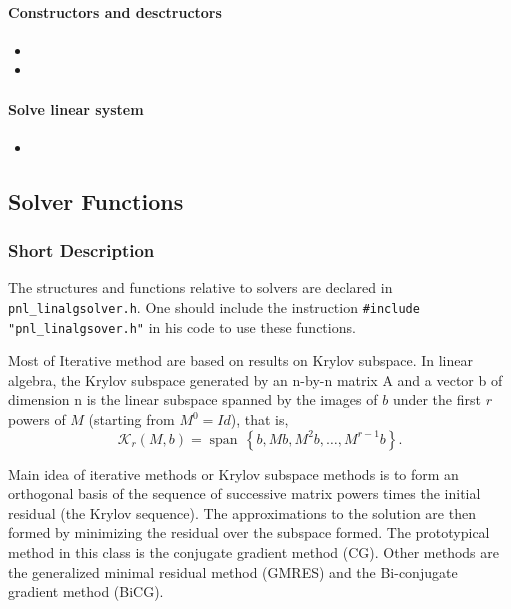 \paragraph{Constructors and desctructors}
\begin{itemize}
\item {}
\item {}
\end{itemize}
\paragraph{Solve linear system}
\begin{itemize}
\item {}
\end{itemize}


\subsection{Solver Functions}
\subsubsection{Short Description}

The structures and functions relative to solvers are declared in
\verb!pnl_linalgsolver.h!. One should include the instruction
\verb!#include "pnl_linalgsover.h"! in his code to use these functions.


Most of Iterative method are based on results on Krylov subspace. In linear
algebra, the Krylov subspace generated by an n-by-n matrix A and a vector b of
dimension n is the linear subspace spanned by the images of $b$ under the
first $r$ powers of $M$ (starting from $M^0 = Id$), that is,
$$  \mathcal{K}_r(M, b) = \operatorname{span} \, \left\{ b, M b, M^2b,
  \ldots, M^{r-1}b\right\}.$$ 

Main idea of iterative methods or Krylov subspace methods is to form an
orthogonal basis of the sequence of successive matrix powers times the initial
residual (the Krylov sequence). The approximations to the solution are then
formed by minimizing the residual over the subspace formed.  The prototypical
method in this class is the conjugate gradient method (CG). Other methods are
the generalized minimal residual method (GMRES) and the Bi-conjugate gradient
method (BiCG).

